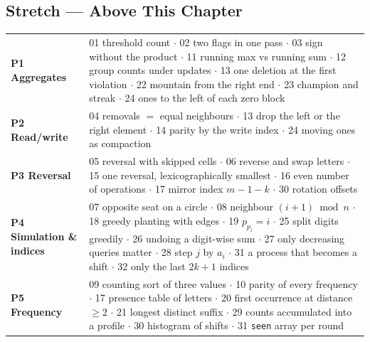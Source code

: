 \subsection*{Stretch --- Above This Chapter \exstretch}


\begin{tcolorbox}[enhanced, breakable, colback=white, colframe=accentorange, boxrule=1pt, arc=2mm,
    title={Topic index of the practice set --- one idea per problem}, fonttitle=\bfseries, colbacktitle=accentorange]
\small
\renewcommand{\arraystretch}{1.2}
\begin{tabularx}{\linewidth}{@{}>{\bfseries}l X@{}}
P1 Aggregates & 01 threshold count $\cdot$ 02 two flags in one pass $\cdot$ 03 sign without the product $\cdot$ 11 running max vs running sum $\cdot$ 12 group counts under updates $\cdot$ 13 one deletion at the first violation $\cdot$ 22 mountain from the right end $\cdot$ 23 champion and streak $\cdot$ 24 ones to the left of each zero block \\
P2 Read/write & 04 removals $=$ equal neighbours $\cdot$ 13 drop the left or the right element $\cdot$ 14 parity by the write index $\cdot$ 24 moving ones as compaction \\
P3 Reversal & 05 reversal with skipped cells $\cdot$ 06 reverse and swap letters $\cdot$ 15 one reversal, lexicographically smallest $\cdot$ 16 even number of operations $\cdot$ 17 mirror index $m-1-k$ $\cdot$ 30 rotation offsets \\
P4 Simulation \& indices & 07 opposite seat on a circle $\cdot$ 08 neighbour $(i+1) \bmod n$ $\cdot$ 18 greedy planting with edges $\cdot$ 19 $p_{p_i} = i$ $\cdot$ 25 split digits greedily $\cdot$ 26 undoing a digit-wise sum $\cdot$ 27 only decreasing queries matter $\cdot$ 28 step $j$ by $a_i$ $\cdot$ 31 a process that becomes a shift $\cdot$ 32 only the last $2k+1$ indices \\
P5 Frequency & 09 counting sort of three values $\cdot$ 10 parity of every frequency $\cdot$ 17 presence table of letters $\cdot$ 20 first occurrence at distance $\ge 2$ $\cdot$ 21 longest distinct suffix $\cdot$ 29 counts accumulated into a profile $\cdot$ 30 histogram of shifts $\cdot$ 31 \texttt{seen} array per round \\
\end{tabularx}
\end{tcolorbox}
